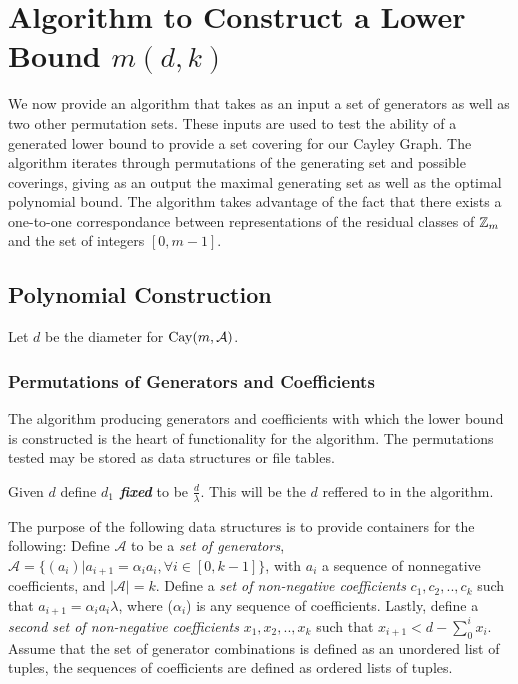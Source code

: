 \section{Algorithm to Construct a Lower Bound $m(d, k)$}

We now provide an algorithm that takes as an input a set of generators as well as two other permutation sets. These inputs are used to test the ability of a generated lower bound to provide a set covering for our Cayley Graph. The algorithm iterates through permutations of the generating set and possible coverings, giving as an output the maximal generating set as well as the optimal polynomial bound. \n
The algorithm takes advantage of the fact that there exists a one-to-one correspondance between representations of the residual classes of $\mbox{$\mathbb Z$}_m$ and the set of integers $[0, m-1]$.\n

\subsection{Polynomial Construction}
\noindent
Let $d$ be the diameter for $\operatorname{Cay}(m, \mathcal{A})$.\n 

\subsubsection{Permutations of Generators and Coefficients}
The algorithm producing generators and coefficients with which the lower bound is constructed is the heart of functionality for the algorithm. \n
The permutations tested may be stored as data structures or file tables.

\noindent
Given $d$ define \emph{\bf{$d_{1}$ fixed}} to be $\frac{d}{\lambda}$. This will be the $d$ reffered to in the algorithm.\n

The purpose of the following data structures is to provide containers for the following:\n
Define $\mathcal{A}$ to be a \emph{set of generators}, $\mathcal{A} = \{ (a_{i}) \vert a_{i+1} = \alpha_{i}a_{i},  \forall i \in [0, k-1] \} $, with $a_i$ a sequence of nonnegative coefficients, and $\vert \mathcal{A} \vert = k$.\n
Define a \emph{set of non-negative coefficients} $c_1, c_2, .. , c_k$ such that $a_{i+1} = \alpha_{i}a_{i} \lambda$, where ($\alpha_{i}$) is any sequence of coefficients.\n
Lastly, define a \emph{second set of non-negative coefficients} $x_1, x_2, .., x_{k}$ such that $x_{i+1} < d - \sum_{0}^{i}x_i$.
\noindent
Assume that the set of generator combinations is defined as an unordered list of tuples, the sequences of coefficients are defined as ordered lists of tuples.

